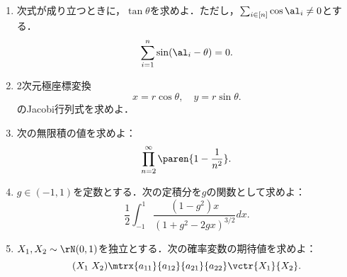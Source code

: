 \documentclass[uplatex,dvipdfmx]{jsarticle}
\begin{document}
\begin{tcolorbox}[colframe=ForestGreen, colback=ForestGreen!10!white,breakable,colbacktitle=ForestGreen!40!white,coltitle=black,fonttitle=\bfseries\sffamily,
    title=第１問]
    \begin{problem}\mbox{}
        \begin{enumerate}[{問}1]
            \item 次式が成り立つときに，$\tan\theta$を求めよ．ただし，$\sum_{i\in[n]}\cos\al_i\ne0$とする．
            \[\sum_{i=1}^n\sin(\al_i-\theta)=0.\]
            \item 2次元極座標変換
            \[x=r\cos\theta,\quad y=r\sin\theta.\]
            のJacobi行列式を求めよ．
            \item 次の無限積の値を求めよ：
            \[\prod_{n=2}^\infty\paren{1-\frac{1}{n^2}}.\]
            \item $g\in(-1,1)$を定数とする．次の定積分を$g$の関数として求めよ：
            \[\frac{1}{2}\int^1_{-1}\frac{(1-g^2)x}{(1+g^2-2gx)^{3/2}}dx.\]
            \item $X_1,X_2\sim\rN(0,1)$を独立とする．次の確率変数の期待値を求めよ：
            \[(X_1\;X_2)\mtrx{a_{11}}{a_{12}}{a_{21}}{a_{22}}\vctr{X_1}{X_2}.\]
        \end{enumerate}
    \end{problem}
\end{tcolorbox}
\end{document}
